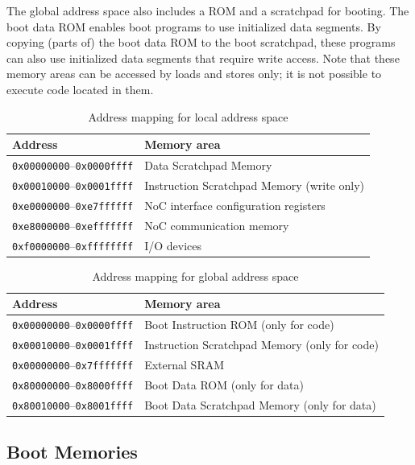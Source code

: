 \documentclass[a4paper,fontsize=10pt,twoside,DIV15,BCOR12mm,headinclude=true,footinclude=false,pagesize,bibtotoc]{scrbook}
\newcommand{\code}[1]{{\texttt{#1}}}
\begin{document}
The global address space also includes a ROM and a scratchpad for
booting. The boot data ROM enables boot programs to use initialized
data segments. By copying (parts of) the boot data ROM to the boot
scratchpad, these programs can also use initialized data segments that
require write access. Note that these memory areas can be accessed by
loads and stores only; it is not possible to execute code located in
them.

\begin{table}
\centering
\begin{tabular}{ll}
\toprule
Address & Memory area \\
\midrule
\code{0x00000000}--\code{0x0000ffff} & Data Scratchpad Memory \\
\code{0x00010000}--\code{0x0001ffff} & Instruction Scratchpad Memory (write only) \\
\code{0xe0000000}--\code{0xe7ffffff} & NoC interface configuration registers \\
\code{0xe8000000}--\code{0xefffffff} & NoC communication memory \\
\code{0xf0000000}--\code{0xffffffff} & I/O devices \\
\bottomrule
\end{tabular}
\caption{Address mapping for local address space}
\label{tab:lmmap}
\end{table}

\begin{table}
\centering
\begin{tabular}{ll}
\toprule
Address & Memory area \\
\midrule
\code{0x00000000}--\code{0x0000ffff} & Boot Instruction ROM (only for code) \\
\code{0x00010000}--\code{0x0001ffff} & Instruction Scratchpad Memory (only for code) \\
\code{0x00000000}--\code{0x7fffffff} & External SRAM \\
\code{0x80000000}--\code{0x8000ffff} & Boot Data ROM (only for data) \\
\code{0x80010000}--\code{0x8001ffff} & Boot Data Scratchpad Memory (only for data) \\
\bottomrule
\end{tabular}
\caption{Address mapping for global address space}
\label{tab:gmmap}
\end{table}

\subsection{Boot Memories}
\end{document}
